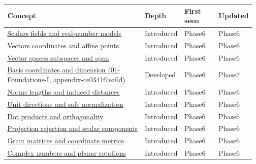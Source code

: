 {\def\LTcaptype{none} %
\begin{longtable}[]{@{}
  >{\raggedright\arraybackslash}p{}
  >{\raggedright\arraybackslash}p{}
  >{\raggedright\arraybackslash}p{}
  >{\raggedright\arraybackslash}p{}@{}}
\toprule\noalign{}
\begin{minipage}[b]{\linewidth}\raggedright
Concept
\end{minipage} & \begin{minipage}[b]{\linewidth}\raggedright
Depth
\end{minipage} & \begin{minipage}[b]{\linewidth}\raggedright
First seen
\end{minipage} & \begin{minipage}[b]{\linewidth}\raggedright
Updated
\end{minipage} \\
\midrule\noalign{}
\endhead
\bottomrule\noalign{}
\endlastfoot
\hyperref[appendix-52051ad550fe]{Scalars fields and real-number models} & Introduced & Phase6 & Phase6 \\
\hyperref[appendix-0659864c0aa3]{Vectors coordinates and affine points} & Introduced & Phase6 & Phase6 \\
\hyperref[appendix-173b52c063ae]{Vector spaces subspaces and span} & Introduced & Phase6 & Phase6 \\
\href{}{Basis coordinates and dimension (01-Foundations-I, appendix-ce0341f7ea0d)} & Developed & Phase6 & Phase7 \\
\hyperref[appendix-49933872bb51]{Norms lengths and induced distances} & Introduced & Phase6 & Phase6 \\
\hyperref[appendix-f744e41b95b4]{Unit directions and safe normalization} & Introduced & Phase6 & Phase6 \\
\hyperref[appendix-8bc4e8fc547c]{Dot products and orthogonality} & Introduced & Phase6 & Phase6 \\
\hyperref[appendix-505a502c372a]{Projection rejection and scalar components} & Introduced & Phase6 & Phase6 \\
\hyperref[appendix-3b863809f82a]{Gram matrices and coordinate metrics} & Introduced & Phase6 & Phase6 \\
\hyperref[appendix-f77eadcc4a93]{Complex numbers and planar rotations} & Introduced & Phase6 & Phase6 \\

\end{longtable}}
